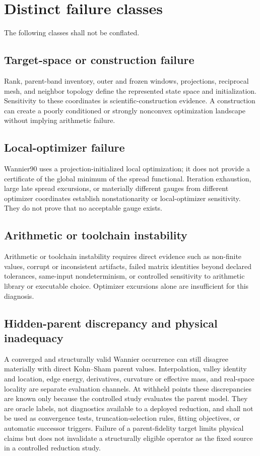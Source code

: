 \documentclass[11pt]{article}
\begin{document}
\section{Distinct failure classes}

The following classes shall not be conflated.

\subsection{Target-space or construction failure}

Rank, parent-band inventory, outer and frozen windows, projections, reciprocal mesh, and
neighbor topology define the represented state space and initialization.  Sensitivity to
these coordinates is scientific-construction evidence.  A construction can create a
poorly conditioned or strongly nonconvex optimization landscape without implying
arithmetic failure.

\subsection{Local-optimizer failure}

Wannier90 uses a projection-initialized local optimization; it does not provide a
certificate of the global minimum of the spread functional.  Iteration exhaustion,
large late spread excursions, or materially different gauges from different optimizer
coordinates establish nonstationarity or local-optimizer sensitivity.  They do not prove
that no acceptable gauge exists.

\subsection{Arithmetic or toolchain instability}

Arithmetic or toolchain instability requires direct evidence such as non-finite values,
corrupt or inconsistent artifacts, failed matrix identities beyond declared tolerances,
same-input nondeterminism, or controlled sensitivity to arithmetic library or executable
choice.  Optimizer excursions alone are insufficient for this diagnosis.

\subsection{Hidden-parent discrepancy and physical inadequacy}

A converged and structurally valid Wannier occurrence can still disagree materially
with direct Kohn--Sham parent values.  Interpolation, valley identity and location, edge
energy, derivatives, curvature or effective mass, and real-space locality are separate
evaluation channels.  At withheld points these discrepancies are known only because the
controlled study evaluates the parent model.  They are oracle labels, not diagnostics
available to a deployed reduction, and shall not be used as convergence tests,
truncation-selection rules, fitting objectives, or automatic successor triggers.
Failure of a parent-fidelity target limits physical claims but does not invalidate a
structurally eligible operator as the fixed source in a controlled reduction study.
\end{document}
